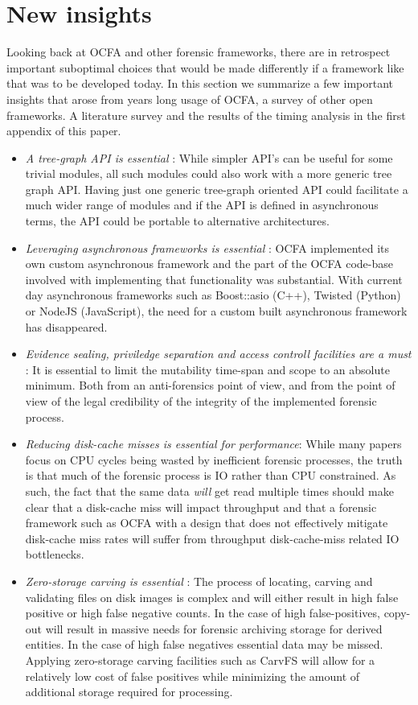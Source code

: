 \section{New insights}
Looking back at OCFA and other forensic frameworks, there are in retrospect important suboptimal choices that would be made differently if a framework like that was to be developed today. In this section we summarize a few important insights that arose from years long usage of OCFA, a survey of other open frameworks. A literature survey and the results of the timing analysis in the first appendix of this paper.
\begin{itemize}
\item \emph{A tree-graph API is essential} : While simpler API's can be useful for some trivial modules, all such modules could also work with a more generic tree graph API. Having just one generic tree-graph oriented API could facilitate a much wider range of modules and if the API is defined in asynchronous terms, the API could be portable to alternative architectures.
\item \emph{Leveraging asynchronous frameworks is essential} : OCFA implemented its own custom asynchronous framework and the part of the OCFA code-base involved with implementing that functionality was substantial. With current day asynchronous frameworks such as Boost::asio (C++), Twisted (Python) or NodeJS (JavaScript), the need for a custom built asynchronous framework has disappeared.
\item \emph{Evidence sealing, priviledge separation and access controll facilities are a must} : It is essential to limit the mutability time-span and scope to an absolute minimum. Both from an anti-forensics point of view, and from the point of view of the legal credibility of the integrity of the implemented forensic process.
\item \emph{Reducing disk-cache misses is essential for performance}: While many papers focus on CPU cycles being wasted by inefficient forensic processes, the truth is that much of the forensic process is IO rather than CPU constrained. As such, the fact that the same data \emph{will} get read multiple times should make clear that a disk-cache miss will impact throughput and that a forensic framework such as OCFA with a design that does not effectively mitigate disk-cache miss rates will suffer from throughput disk-cache-miss related IO bottlenecks.
\item \emph{Zero-storage carving is essential} : The process of locating, carving and validating files on disk images is complex and will either result in high false positive or high false negative counts. In the case of high false-positives, copy-out will result in massive needs for forensic archiving storage for derived entities. In the case of high false negatives essential data may be missed. Applying zero-storage carving facilities such as CarvFS will allow for a relatively low cost of false positives while minimizing the amount of additional storage required for processing.

\end{itemize}
